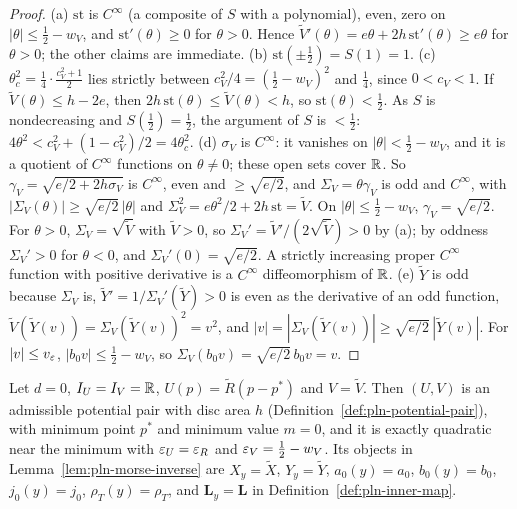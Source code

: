 \begin{proof}
(a) $\mathrm{st}$ is $C^\infty$ (a composite of $S$ with a polynomial), even, zero on $|\theta|\le\frac12-w_V$, and
$\mathrm{st}'(\theta)\ge0$ for $\theta>0$. Hence $\tilde V'(\theta)=e\theta+2h\,\mathrm{st}'(\theta)\ge e\theta$ for $\theta>0$; the other claims are
immediate. (b) $\mathrm{st}(\pm\frac12)=S(1)=1$. (c) $\theta_c^2=\frac14\cdot\frac{c_V^2+1}2$ lies strictly between
$c_V^2/4=(\frac12-w_V)^2$ and $\frac14$, since $0<c_V<1$. If $\tilde V(\theta)\le h-2e$, then
$2h\,\mathrm{st}(\theta)\le\tilde V(\theta)<h$, so $\mathrm{st}(\theta)<\frac12$. As $S$ is nondecreasing and $S(\frac12)=\frac12$,
the argument of $S$ is $<\frac12$: $4\theta^2<c_V^2+(1-c_V^2)/2=4\theta_c^2$. (d) $\sigma_V$ is $C^\infty$: it vanishes on
$|\theta|<\frac12-w_V$, and it is a quotient of $C^\infty$ functions on $\theta\ne0$; these open sets cover $\mathbb{R}$. So
$\gamma_V=\sqrt{e/2+2h\sigma_V}$ is $C^\infty$, even and $\ge\sqrt{e/2}$, and $\Sigma_V=\theta\gamma_V$ is odd and
$C^\infty$, with $|\Sigma_V(\theta)|\ge\sqrt{e/2}\,|\theta|$ and $\Sigma_V^2=e\theta^2/2+2h\,\mathrm{st}=\tilde V$. On
$|\theta|\le\frac12-w_V$, $\gamma_V=\sqrt{e/2}$. For $\theta>0$, $\Sigma_V=\sqrt{\tilde V}$ with $\tilde V>0$, so
$\Sigma_V'=\tilde V'/(2\sqrt{\tilde V})>0$ by (a); by oddness $\Sigma_V'>0$ for $\theta<0$, and
$\Sigma_V'(0)=\sqrt{e/2}$. A strictly increasing proper $C^\infty$ function with positive derivative is a $C^\infty$
diffeomorphism of $\mathbb{R}$. (e) $\tilde Y$ is odd because $\Sigma_V$ is, $\tilde Y'=1/\Sigma_V'(\tilde Y)>0$ is even
as the derivative of an odd function, $\tilde V(\tilde Y(v))=\Sigma_V(\tilde Y(v))^2=v^2$, and
$|v|=|\Sigma_V(\tilde Y(v))|\ge\sqrt{e/2}\,|\tilde Y(v)|$. For $|v|\le v_\varepsilon$, $|b_0v|\le\frac12-w_V$, so
$\Sigma_V(b_0v)=\sqrt{e/2}\,b_0v=v$.
\end{proof}

\begin{lemma}\label{lem:pll-pair}
Let $d=0$, $I_U=I_V=\mathbb{R}$, $U(p)=\tilde R(p-p^*)$ and $V=\tilde V$. Then $(U,V)$ is an admissible potential pair with
disc area $h$ (Definition~\ref{def:pln-potential-pair}), with minimum point $p^*$ and minimum value $m=0$, and it is
exactly quadratic near the minimum with $\varepsilon_U=\varepsilon_R$ and $\varepsilon_V=\frac12-w_V$. Its objects in
Lemma~\ref{lem:pln-morse-inverse} are $X_y=\tilde X$, $Y_y=\tilde Y$, $a_0(y)=a_0$, $b_0(y)=b_0$, $j_0(y)=j_0$,
$\rho_T(y)=\rho_T$, and $\mathbf L_y=\mathbf L$ in Definition~\ref{def:pln-inner-map}.
\end{lemma}

